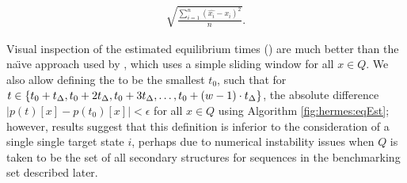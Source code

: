 \documentclass[11pt, oneside]{Thesis} %
\begin{document}
\begin{align}
\label{eq:hermes:rmsd}
\sqrt{\frac{\sum_{i=1}^{n} (\widehat{x_i} - x_i)^2}{n}}.
\end{align}

Visual inspection of the estimated equilibrium times
() are much better than the
na\"{\i}ve approach used by \treekin, which uses a simple sliding window for
all $x \in Q$.
We also allow defining the \eqt to be the
smallest $t_0$, such that for
$t \in \{t_0+t_{\Delta},t_0+2t_{\Delta},t_0+3t_{\Delta},\dots,t_0+(w-1)\cdot t_{\Delta}\}$, the
absolute difference $|p(t)[x] - p(t_0)[x]| < \epsilon$ for all $x \in
Q$ using Algorithm \ref{fig:hermes:eqEst};
however, results suggest that this definition is inferior
to the consideration of a single single target state $i$,
perhaps due to numerical instability issues when
$Q$ is taken to be the set of all secondary structures for sequences in
the benchmarking set described later.
\end{document}
